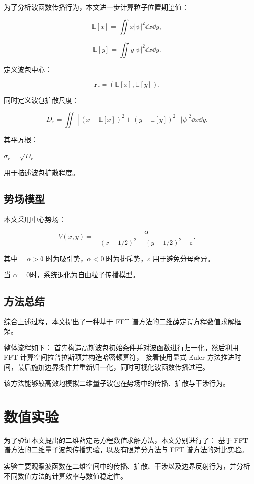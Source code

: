 \documentclass[UTF8,a4paper,12pt]{ctexart}
\begin{document}
为了分析波函数传播行为，本文进一步计算粒子位置期望值：

\[
\mathbb E[x]
=
\iint x|\psi|^2 \dd x\dd y,
\]

\[
\mathbb E[y]
=
\iint y|\psi|^2 \dd x\dd y.
\]

定义波包中心：

\[
\bm r_c
=
(\mathbb E[x],\mathbb E[y]).
\]

同时定义波包扩散尺度：

\[
D_r
=
\iint
\left[
(x-\mathbb E[x])^2
+
(y-\mathbb E[y])^2
\right]
|\psi|^2
\dd x\dd y.
\]

其平方根：

$\sigma_r=\sqrt{D_r}$

用于描述波包扩散程度。

\subsection{势场模型}

本文采用中心势场：

\[
V(x,y)
=
-\frac{\alpha}
{
(x-1/2)^2+(y-1/2)^2+\varepsilon
}.
\]

其中：
$\alpha>0$ 时为吸引势，$\alpha<0$ 时为排斥势，$\varepsilon$ 用于避免分母奇异。

当 $\alpha=0$时，系统退化为自由粒子传播模型。

\subsection{方法总结}

综合上述过程，本文提出了一种基于 FFT 谱方法的二维薛定谔方程数值求解框架。

整体流程如下：
首先构造高斯波包初始条件并对波函数进行归一化，然后利用 FFT 计算空间拉普拉斯项并构造哈密顿算符，
接着使用显式 Euler 方法推进时间，最后施加边界条件并重新归一化，同时可视化波函数传播过程。

该方法能够较高效地模拟二维量子波包在势场中的传播、扩散与干涉行为。

\section{数值实验}

为了验证本文提出的二维薛定谔方程数值求解方法，本文分别进行了：
基于 FFT 谱方法的二维量子波包传播实验，以及有限差分方法与 FFT 谱方法的对比实验。

实验主要观察波函数在二维空间中的传播、扩散、干涉以及边界反射行为，并分析不同数值方法的计算效率与数值稳定性。
\end{document}
